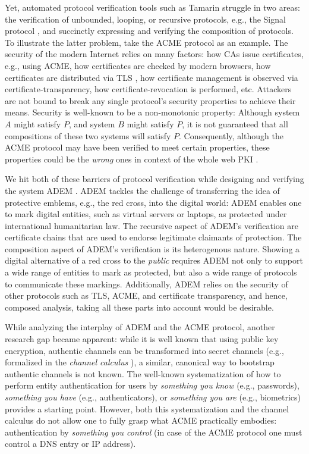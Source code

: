 \documentclass{article}
\begin{document}
Yet, automated protocol verification tools such as Tamarin \cite{tamarin} struggle in two areas: the verification of unbounded, looping, or recursive protocols, e.g., the Signal protocol \cite{SignalBlog}, and succinctly expressing and verifying the composition of protocols.
To illustrate the latter problem, take the \gls{ACME} protocol as an example.
The security of the modern Internet relies on many factors: how \glspl{CA} issue certificates, e.g., using \gls{ACME}, how certificates are checked by modern browsers, how certificates are distributed via TLS \cite{TLSRFC}, how certificate management is observed via certificate-transparency, how certificate-revocation is performed, etc.
Attackers are not bound to break any single protocol's security properties to achieve their means.
Security is well-known to be a non-monotonic property: Although system $A$ might satisfy $P$, and system $B$ might satisfy $P$, it is not guaranteed that all compositions of these two systems will satisfy $P$.
Consequently, although the \gls{ACME} protocol may have been verified to meet certain properties, these properties could be the \textit{wrong} ones in context of the whole web \gls{PKI} \cite{WebPKIMissingLinks}.

We hit both of these barriers of protocol verification while designing and verifying the system \gls{ADEM} \cite{BlogADEM}.
\Gls{ADEM} tackles the challenge of transferring the idea of protective emblems, e.g., the red cross, into the digital world: \gls{ADEM} enables one to mark digital entities, such as virtual servers or laptops, as protected under international humanitarian law.
The recursive aspect of \gls{ADEM}'s verification are certificate chains that are used to endorse legitimate claimants of protection.
The composition aspect of \gls{ADEM}'s verification is its heterogenous nature.
Showing a digital alternative of a red cross to the \textit{public} requires \gls{ADEM} not only to support a wide range of entities to mark as protected, but also a wide range of protocols to communicate these markings.
Additionally, \gls{ADEM} relies on  the security of other protocols such as TLS, \gls{ACME}, and certificate transparency, and hence, composed analysis, taking all these parts into account would be desirable.

While analyzing the interplay of \gls{ADEM} and the \gls{ACME} protocol, another research gap became apparent: while it is well known that using public key encryption, authentic channels can be transformed into secret channels (e.g., formalized in the \textit{channel calculus} \cite{ChannelCalculus}), a similar, canonical way to bootstrap authentic channels is not known.
The well-known systematization of how to perform entity authentication for users by \textit{something you know} (e.g., passwords), \textit{something you have} (e.g., authenticators), or \textit{something you are} (e.g., biometrics) \cite{SomethingYou} provides a starting point.
However, both this systematization and the channel calculus do not allow one to fully grasp what \gls{ACME} practically embodies: authentication by \textit{something you control} (in case of the \gls{ACME} protocol one must control a \gls{DNS} entry or IP address).
\end{document}

